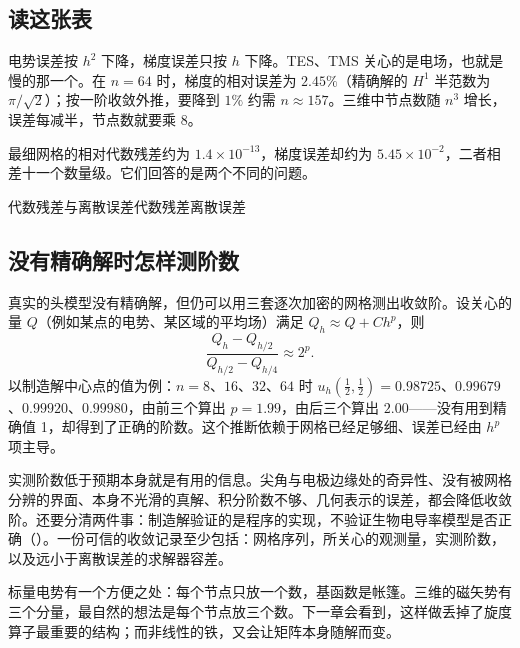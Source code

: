 \subsection{读这张表}
电势误差按 $h^2$ 下降，梯度误差只按 $h$ 下降。TES、TMS 关心的是电场，也就是慢的那一个。在 $n=64$ 时，梯度的相对误差为 $2.45\%$（精确解的 $H^1$ 半范数为 $\pi/\sqrt2$）；按一阶收敛外推，要降到 $1\%$ 约需 $n\approx157$。三维中节点数随 $n^3$ 增长，误差每减半，节点数就要乘 8。

最细网格的相对代数残差约为 $1.4\times10^{-13}$，梯度误差却约为 $5.45\times10^{-2}$，二者相差十一个数量级。它们回答的是两个不同的问题。

\begin{compare}{代数残差与离散误差}{代数残差}{离散误差}
\end{compare}

\subsection{没有精确解时怎样测阶数}
真实的头模型没有精确解，但仍可以用三套逐次加密的网格测出收敛阶。设关心的量 $Q$（例如某点的电势、某区域的平均场）满足 $Q_h\approx Q+Ch^p$，则
\begin{equation*}
\frac{Q_h-Q_{h/2}}{Q_{h/2}-Q_{h/4}}\approx2^p .
\end{equation*}
以制造解中心点的值为例：$n=8$、$16$、$32$、$64$ 时 $u_h(\tfrac12,\tfrac12)=0.98725$、$0.99679$、$0.99920$、$0.99980$，由前三个算出 $p=1.99$，由后三个算出 $2.00$——没有用到精确值 1，却得到了正确的阶数。这个推断依赖于网格已经足够细、误差已经由 $h^p$ 项主导。

实测阶数低于预期本身就是有用的信息。尖角与电极边缘处的奇异性、没有被网格分辨的界面、本身不光滑的真解、积分阶数不够、几何表示的误差，都会降低收敛阶。还要分清两件事：制造解验证的是程序的实现，不验证生物电导率模型是否正确（）。一份可信的收敛记录至少包括：网格序列，所关心的观测量，实测阶数，以及远小于离散误差的求解器容差。

标量电势有一个方便之处：每个节点只放一个数，基函数是帐篷。三维的磁矢势有三个分量，最自然的想法是每个节点放三个数。下一章会看到，这样做丢掉了旋度算子最重要的结构；而非线性的铁，又会让矩阵本身随解而变。

